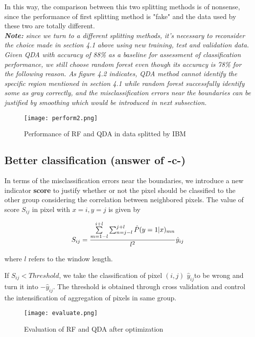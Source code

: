 \documentclass[11pt]{scrartcl} %
\begin{document}
In this way, the comparison between this two splitting methods is of nonsense, since the performance of first splitting method is "fake" and the data used by these two are totally different. \\


\textit{\textbf{Note: }since we turn to a different splitting methods, it's necessary to reconsider the choice made in section 4.1 above using new training, test and validation data. Given QDA with accuracy of 88\% as a baseline for assessment of classification performance, we still choose random forest even though its accuracy is 78\% for the following reason. As figure 4.2 indicates, QDA method cannot identify the specific region mentioned in section 4.1 while random forest successfully identify some as gray correctly, and the misclassification errors near the boundaries can be justified by smoothing which would be introduced in next subsection.}

\begin{figure}[htb]
	\centering
	\texttt{[image: perform2.png]} %
	\caption{Performance of RF and QDA in data splitted by IBM}
\end{figure}

\subsection{Better classification (answer of -c-)}
In terms of the misclassification errors near the boundaries, we introduce a new indicator \textbf{score} to justify whether or not the pixel should be classified to the other group considering the correlation between neighbored pixels. The value of score $S_{ij}$ in pixel with $x=i,y=j$ is given by

$$
S_{ij} = \frac{\sum_{m=1-l}^{i+l}\limits\sum_{n=j-l}^{j+l}\hat{P}(y=1 | x)_{mn}}{l^2}\hat{y}_{ij}
$$

where $l$ refers to the window length.

If $S_{ij} < Threshold$, we take the classification of pixel $(i,j)$  $\hat{y}_{ij}$to be wrong and turn it into $-\hat{y}_{ij}$. The threshold is obtained through cross validation and control the intensification of aggregation of pixels in same group.

\begin{figure}[htb]
	\centering
	\texttt{[image: evaluate.png]} %
	\caption{Evaluation of RF and QDA after optimization}
\end{figure}
\end{document}
